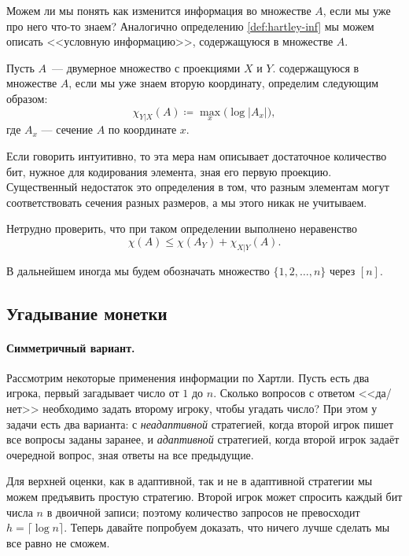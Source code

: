 
Можем ли мы понять как изменится информация во множестве $A$, если мы уже про него что-то знаем?
Аналогично определению \ref{def:hartley-inf} мы можем описать <<условную информацию>>, содержащуюся в
множестве $A$.

\begin{definition}
	Пусть $A$~--- двумерное множество с проекциями $X$ и $Y$.  содержащуюся
    в множестве $A$, если мы уже знаем вторую координату, определим следующим образом: 
	$$
        \chi_{Y|X}(A) \coloneqq \max_x{\big(\log|A_x|\big)},
    $$ 
	где $A_x$ --- сечение $A$ по координате $x$.
\end{definition}

Если говорить интуитивно, то эта мера нам описывает достаточное количество бит, нужное для кодирования
элемента, зная его первую проекцию. Существенный недостаток это определения в том, что разным элементам
могут соответствовать сечения разных размеров, а мы этого никак не учитываем.

Нетрудно проверить, что при таком определении выполнено неравенство
$$
    \chi(A) \le \chi(A_Y) + \chi_{X|Y}(A).
$$


В дальнейшем иногда мы будем обозначать множество  $\{1, 2, \dots, n\}$ через $[n]$.

\subsection{Угадывание монетки}

\paragraph{Симметричный вариант.}
Рассмотрим некоторые применения информации по Хартли. Пусть есть два игрока, первый загадывает число от
$1$ до $n$. Сколько вопросов с ответом <<да/нет>> необходимо задать второму игроку, чтобы угадать число?
При этом у задачи есть два варианта: с \textit{неадаптивной} стратегией, когда второй игрок пишет все
вопросы заданы заранее, и \textit{адаптивной} стратегией, когда второй игрок задаёт очередной вопрос,
зная ответы на все предыдущие.  

Для верхней оценки, как в адаптивной, так и не в адаптивной стратегии мы можем предъявить простую
стратегию. Второй игрок может спросить каждый бит числа $n$ в двоичной записи; поэтому количество
запросов не превосходит $h = \lceil \log n \rceil$. Теперь давайте попробуем доказать, что ничего лучше
сделать мы все равно не сможем.
	
